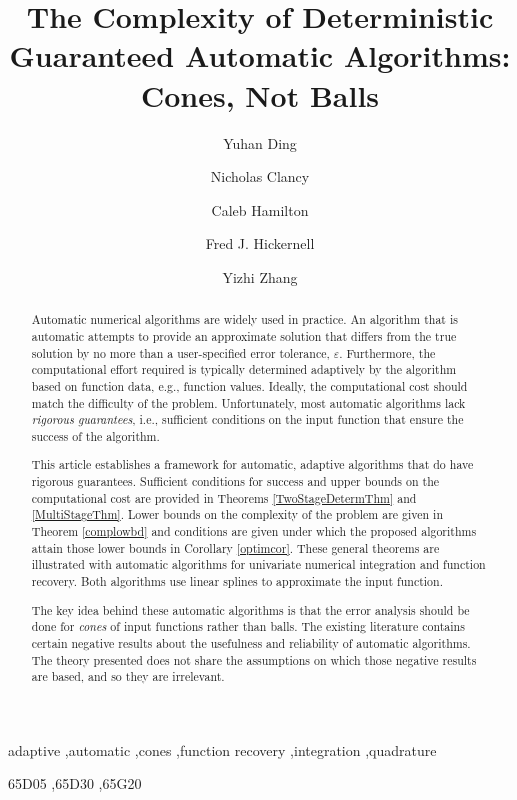 \documentclass[]{elsarticle}
\theoremstyle{definition}
\theoremstyle{remark}
\begin{document}
\begin{frontmatter}

\title{The Complexity of Deterministic Guaranteed Automatic Algorithms:  Cones, Not Balls}
\author{Yuhan Ding}
\author{Nicholas Clancy}
\author{Caleb Hamilton}
\author{Fred J. Hickernell}
\author{Yizhi Zhang}
\address{Room E1-208, Department of Applied Mathematics, Illinois Institute of Technology,\\ 10 W.\ 32$^{\text{nd}}$ St., Chicago, IL 60616}
\begin{abstract} Automatic numerical algorithms are widely used in practice.  An algorithm that is automatic attempts to provide an approximate solution that differs from the true solution by no more than a user-specified error tolerance, $\varepsilon$. Furthermore, the computational effort required is typically determined adaptively by the algorithm based on function data, e.g., function values.  Ideally, the computational cost should match the difficulty of the problem.  Unfortunately, most automatic algorithms lack \emph{rigorous guarantees}, i.e., sufficient conditions on the input function that ensure the success of the algorithm. 

This article establishes a framework for automatic, adaptive algorithms that do have rigorous guarantees. Sufficient conditions for success and upper bounds on the computational cost are provided in Theorems \ref{TwoStageDetermThm} and \ref{MultiStageThm}.  Lower bounds on the complexity of the problem are given in Theorem \ref{complowbd} and conditions are given under which the proposed algorithms attain those lower bounds in Corollary \ref{optimcor}. These general theorems are illustrated with automatic algorithms for univariate numerical integration and function recovery.  Both algorithms use linear splines to approximate the input function.  

The key idea behind these automatic algorithms is that the error analysis should be done for \emph{cones} of input functions rather than balls. The existing literature contains certain negative results about the usefulness and reliability of automatic algorithms.  The theory presented does not share the assumptions on which those negative results are based, and so they are irrelevant.
\end{abstract}

\begin{keyword}
adaptive \sep automatic \sep cones \sep function recovery \sep integration \sep quadrature

\MSC[2010] 65D05 \sep 65D30 \sep 65G20

\end{keyword}
\end{frontmatter}
\end{document}
